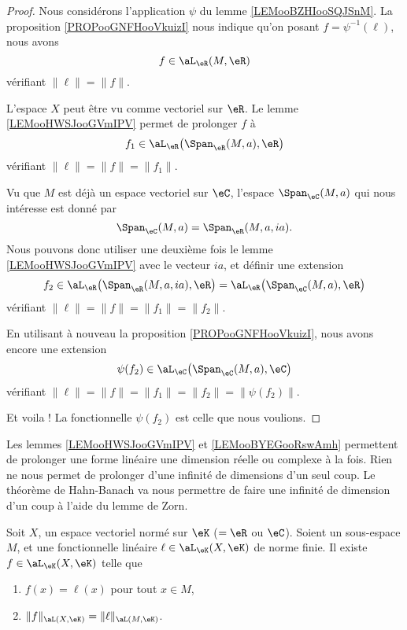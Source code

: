 \begin{proof}
    Nous considérons l'application \( \psi\) du lemme \ref{LEMooBZHIooSQJSnM}. La proposition \ref{PROPooGNFHooVkuizI} nous indique qu'on posant \( f=\psi^{-1}(\ell)\), nous avons 
    \begin{equation}
        f\in\aL_{\eR}(M,\eR)
    \end{equation}
    vérifiant \( \| \ell \|=\| f \|\).

    L'espace \( X\) peut être vu comme vectoriel sur \( \eR\). Le lemme \ref{LEMooHWSJooGVmIPV} permet de prolonger \( f\) à
    \begin{equation}
        f_1\in\aL_{\eR}\big( \Span_{\eR}(M,a),\eR \big)
    \end{equation}
    vérifiant \( \| \ell \|=\| f \|=\| f_1 \|\).

    Vu que \( M\) est déjà un espace vectoriel sur \( \eC\), l'espace \( \Span_{\eC}(M,a)\) qui nous intéresse est donné par
    \begin{equation}
        \Span_{\eC}(M,a)=\Span_{\eR}(M,a,ia).
    \end{equation}
    Nous pouvons donc utiliser une deuxième fois le lemme \ref{LEMooHWSJooGVmIPV} avec le vecteur \( ia\), et définir une extension
    \begin{equation}
        f_2\in\aL_{\eR}\big( \Span_{\eR}(M,a,ia),\eR \big)=\aL_{\eR}\big( \Span_{\eC}(M,a),\eR \big)
    \end{equation}
    vérifiant \( \| \ell \|=\| f \|=\| f_1 \|=\| f_2 \|\).

    En utilisant à nouveau la proposition \ref{PROPooGNFHooVkuizI}, nous avons encore une extension
    \begin{equation}
        \psi(f_2)\in\aL_{\eC}\big( \Span_{\eC}(M,a),\eC \big)
    \end{equation}
    vérifiant \( \| \ell \|=\| f \|=\| f_1 \|=\| f_2 \|=\| \psi(f_2) \|\).

    Et voila ! La fonctionnelle \( \psi(f_2)\) est celle que nous voulions.
\end{proof}

Les lemmes \ref{LEMooHWSJooGVmIPV} et \ref{LEMooBYEGooRswAmh} permettent de prolonger une forme linéaire une dimension réelle ou complexe à la fois. Rien ne nous permet de prolonger d'une infinité de dimensions d'un seul coup. Le théorème de Hahn-Banach va nous permettre de faire une infinité de dimension d'un coup à l'aide du lemme de Zorn.

\begin{theorem}        \label{THOooTZSSooBKfxXE}
    Soit \( X\), un espace vectoriel normé sur \( \eK\) (\(=\eR\) ou \( \eC\)). Soient un sous-espace \( M\), et une fonctionnelle linéaire \( \ell\in\aL_{\eK}(X,\eK)\) de norme finie. Il existe \( f\in\aL_{\eK}(X,\eK)\) telle que 
    \begin{enumerate}
        \item
            \( f(x)=\ell(x)\) pour tout \( x\in M\),
        \item
            \( \| f \|_{\aL(X,\eK)}=\| \ell \|_{\aL(M,\eK)}\).
    \end{enumerate}
\end{theorem}

